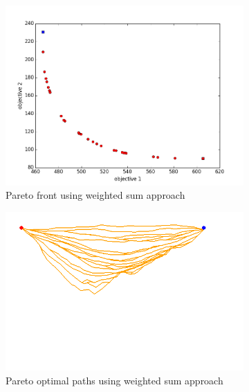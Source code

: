 \documentclass[conference]{IEEEtran}
\begin{document}
\begin{figure}
\begin{subfigure}[b]{0.45\linewidth}
		\includegraphics[width=\textwidth]{fig/sim1-2obj/PF01-MORRT.png}
		\caption{Pareto front using weighted sum approach}
		\label{fig:sim:norm:pf:b}
	\end{subfigure}
	\begin{subfigure}[b]{0.45\linewidth}
		\centering
		\includegraphics[width=\textwidth]{fig/sim1-2obj/MORRTstar00-ALL.png}
		\caption{Pareto optimal paths using weighted sum approach}
		\label{fig:sim:norm:sols:b}
	\end{subfigure}  \\
	\begin{subfigure}[b]{0.45\linewidth}
		\centering

\end{subfigure}
\end{figure}
\end{document}
